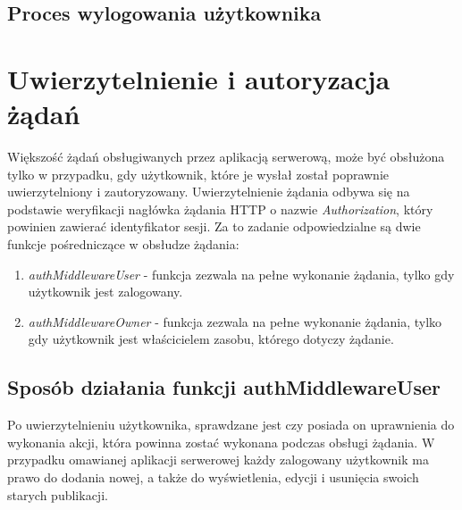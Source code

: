 \documentclass[a4paper,12pt,twoside,openany]{report}
\begin{document}
\subsection{Proces wylogowania użytkownika}

\section{Uwierzytelnienie i autoryzacja żądań}
Większość żądań obsługiwanych przez aplikacją serwerową, może być obsłużona tylko w przypadku, gdy użytkownik, które je wysłał został poprawnie uwierzytelniony i zautoryzowany. 
Uwierzytelnienie żądania odbywa się na podstawie weryfikacji nagłówka żądania HTTP o nazwie \textit{Authorization}, który powinien zawierać identyfikator sesji. Za to zadanie odpowiedzialne są dwie funkcje pośredniczące w obsłudze żądania: 
\begin{enumerate}
	
	\item \textit{authMiddlewareUser} - funkcja zezwala na pełne wykonanie żądania, tylko gdy użytkownik jest zalogowany.
	
	\item \textit{authMiddlewareOwner} - funkcja zezwala na pełne wykonanie żądania, tylko gdy użytkownik jest właścicielem zasobu, którego dotyczy żądanie.
	
\end{enumerate}

\subsection{Sposób działania funkcji authMiddlewareUser}

Po uwierzytelnieniu użytkownika, sprawdzane jest czy posiada on uprawnienia do wykonania akcji, która powinna zostać wykonana podczas obsługi żądania. W przypadku omawianej aplikacji serwerowej każdy zalogowany użytkownik ma prawo do dodania nowej, a także do wyświetlenia, edycji i usunięcia swoich starych publikacji. 
\begin{thebibliography}{99}


\end{thebibliography}

\zakonczenie  %
\end{document}
